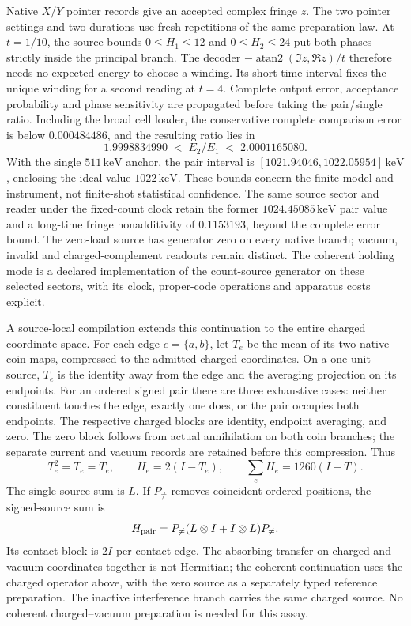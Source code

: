 Native $X/Y$ pointer records give an accepted complex fringe $z$.
The two pointer settings and two durations use fresh repetitions of
the same preparation law.
At $t=1/10$, the source bounds $0\leq H_1\leq12$ and
$0\leq H_2\leq24$ put both phases strictly inside the principal branch.
The decoder $-\operatorname{atan2}(\Im z,\Re z)/t$ therefore needs
no expected energy to choose a winding. Its short-time interval fixes
the unique winding for a second reading at $t=4$.
Complete output error, acceptance probability and phase sensitivity
are propagated before taking the pair/single ratio. Including the broad
cell loader, the conservative complete comparison error is below
$0.000484486$, and the resulting
ratio lies in
\[
 1.9998834990\;<\;E_2/E_1\;<\;2.0001165080.
\]
With the single $511\,\mathrm{keV}$ anchor, the pair interval is
$[1021.94046,1022.05954]\,\mathrm{keV}$, enclosing the ideal value
$1022\,\mathrm{keV}$. These bounds concern the finite model and
instrument, not finite-shot statistical confidence. The same source
sector and reader under the fixed-count clock retain the former
$1024.45085\,\mathrm{keV}$ pair value and a long-time fringe
nonadditivity of $0.1153193$, beyond the complete error bound.
The zero-load source has generator zero on every native branch;
vacuum, invalid and charged-complement readouts remain distinct.
The coherent holding mode is a declared implementation of the
count-source generator on these selected sectors, with its clock,
proper-code operations and apparatus costs explicit.

A source-local compilation extends this continuation to the entire charged
coordinate space. For each edge $e=\{a,b\}$, let $T_e$ be the mean of its
two native coin maps, compressed to the admitted charged coordinates.
On a one-unit source, $T_e$ is the identity away from the edge and the
averaging projection on its endpoints. For an ordered signed pair there
are three exhaustive cases: neither constituent touches the edge, exactly
one does, or the pair occupies both endpoints. The respective charged
blocks are identity, endpoint averaging, and zero. The zero block follows
from actual annihilation on both coin branches; the separate current and
vacuum records are retained before this compression. Thus
\[
 T_e^2=T_e=T_e^\dagger,\qquad H_e=2(I-T_e),\qquad
 \sum_eH_e=1260(I-T).
\]
The single-source sum is $L$. If $P_{\ne}$ removes coincident ordered
positions, the signed-source sum is
\[
 H_{\rm pair}=P_{\ne}(L\otimes I+I\otimes L)P_{\ne}.
\]
Its contact block is $2I$ per contact edge. The absorbing transfer on
charged and vacuum coordinates together is not Hermitian; the coherent
continuation uses the charged operator above, with the zero source as a
separately typed reference preparation. The inactive interference branch
carries the same charged source. No coherent charged--vacuum preparation
is needed for this assay.

